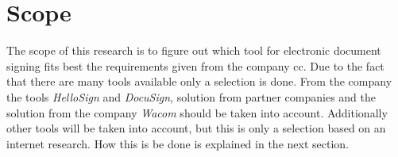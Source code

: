 \section{Scope}
The scope of this research is to figure out which tool for electronic document signing fits best the requirements given from the company \gls{cc}. Due to the fact that there are many tools available only a selection is done. From the company the tools \textit{HelloSign} and \textit{DocuSign}, solution from partner companies and the solution from the company \textit{Wacom} should be taken into account. Additionally other tools will be taken into account, but this is only a selection based on an internet research. How this is be done is explained in the next section.


